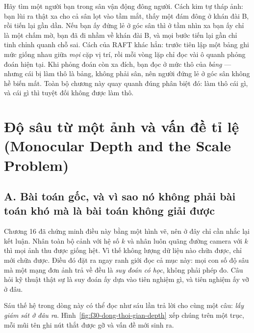\documentclass[../../deep_learning.tex]{subfiles}
\begin{document}
\begin{trucgiac}
Hãy tìm một người bạn trong sân vận động đông người. Cách kim tự tháp ảnh: bạn lùi ra thật xa cho cả sân lọt vào tầm mắt, thấy một đám đông ở khán đài B, rồi tiến lại gần dần. Nếu bạn ấy đứng lẻ ở góc sân thì ở tầm nhìn xa bạn ấy chỉ là một chấm mờ, bạn đã đi nhầm về khán đài B, và mọi bước tiến lại gần chỉ tinh chỉnh quanh chỗ sai. Cách của RAFT khác hẳn: trước tiên lập một bảng ghi mức giống nhau giữa \emph{mọi} cặp vị trí, rồi mỗi vòng lặp chỉ đọc vài ô quanh phỏng đoán hiện tại. Khi phỏng đoán còn xa đích, bạn đọc ở mức thô của \emph{bảng} --- nhưng cái bị làm thô là bảng, không phải sân, nên người đứng lẻ ở góc sân không hề biến mất. Toàn bộ chương này quay quanh đúng phân biệt đó: làm thô cái gì, và cái gì thì tuyệt đối không được làm thô.
\end{trucgiac}

\section{Độ sâu từ một ảnh và vấn đề tỉ lệ (Monocular Depth and the Scale Problem)}
\subsection{A. Bài toán gốc, và vì sao nó không phải bài toán khó mà là bài toán không giải được}
Chương 16 đã chứng minh điều này bằng một hình vẽ, nên ở đây chỉ cần nhắc lại kết luận. Nhân toàn bộ cảnh với hệ số \(k\) và nhân luôn quãng đường camera với \(k\) thì mọi ảnh thu được giống hệt. Vì thế không lượng dữ liệu nào chữa được, chỉ  mới chữa được.
Điều đó đặt ra ngay ranh giới đọc cả mục này: mọi con số độ sâu mà một mạng đơn ảnh trả về đều là \emph{suy đoán có học}, không phải phép đo. Câu hỏi kỹ thuật thật sự là suy đoán ấy dựa vào tiên nghiệm gì, và tiên nghiệm ấy vỡ ở đâu.

Sáu thế hệ trong dòng này có thể đọc như sáu lần trả lời cho cùng một câu: \emph{lấy giám sát ở đâu ra}. Hình~\ref{fig:f30-dong-thoi-gian-depth} xếp chúng trên một trục, mỗi mũi tên ghi nút thắt được gỡ và vấn đề mới sinh ra.
\end{document}
